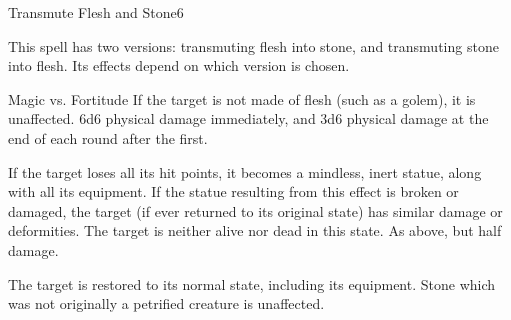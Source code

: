 \begin{spellsection}{Transmute Flesh and Stone}{6}
\begin{spellheader}
    \begin{spelltargetinginfo}
    \end{spelltargetinginfo}
    \begin{spelleffects}
        \begin{spelltargetinginfo}
        \end{spelltargetinginfo}
    \end{spelleffects}
\end{spellheader}
\begin{spellcontent}
    \spellspecial This spell has two versions: transmuting flesh into stone, and transmuting stone into flesh. Its effects depend on which version is chosen.
    \begin{spellattack}{Magic vs. Fortitude}
        \spellspecial If the target is not made of flesh (such as a golem), it is unaffected.
        \spellsuccess 6d6 physical damage immediately, and 3d6 physical damage at the end of each round after the first.

        If the target loses all its hit points, it becomes a mindless, inert statue, along with all its equipment. If the statue resulting from this effect is broken or damaged, the target (if ever returned to its original state) has similar damage or deformities. The target is neither alive nor dead in this state.
        \spellfailure As above, but half damage.

        \spellsuccess The target is restored to its normal state, including its equipment. Stone which was not originally a petrified creature is unaffected.
    \end{spellattack}
\end{spellcontent}
\begin{spellfooter}
\end{spellfooter}
\end{spellsection}

